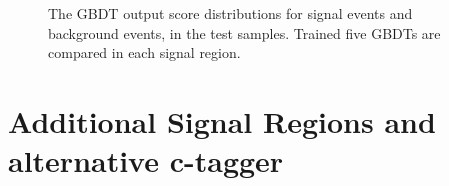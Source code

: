 \begin{figure}[htbp]
	\centering
		\qquad
	\caption{ The GBDT output score distributions for  signal events and  background events, in the test samples.
		Trained five GBDTs are compared in each signal region. 
	}%
	\label{fig:separation:GBDT}
\end{figure}

\clearpage
\section {Additional Signal Regions and alternative c-tagger}
\label{sec:other_selection}
\clearpage

